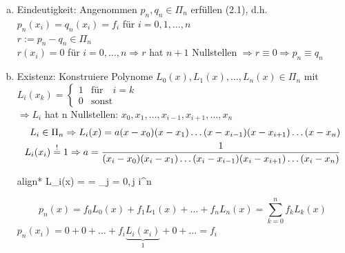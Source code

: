 \begin{enumerate}[(a)]
  \item Eindeutigkeit: Angenommen $p_n, q_n \in \Pi_n$ erfüllen (2.1), d.h. $p_n(x_i)=q_n(x_i)=f_i $ für $i=0,1,\ldots,n$\\
    $r := p_n - q_n \in \Pi_n$ \\
    $r(x_i) = 0$ für $i = 0, \ldots, n \Rightarrow r$ hat $n + 1$ Nullstellen
    $\Rightarrow r \equiv 0 \Rightarrow p_n \equiv q_n$
  \item Existenz: Konstruiere Polynome $L_0(x), L_1(x), \ldots, L_n(x) \in \Pi_n$ mit\\
    $L_i(x_k)=\begin{cases} 1 & \mbox{für } \mbox{ $i = k$} \\ 
      0 & \mbox{sonst} \end{cases}$ \\
    $\Rightarrow L_i$ hat n Nullstellen: $x_0, x_1, \ldots, x_{i-1}, x_{i+1}, \ldots, x_n$
		\begin{align*}    
		L_i \in \Pi_n \Rightarrow L_i(x) = a(x-x_0)(x-x_1)\ldots(x-x_{i-1})(x-x_{i+1})\ldots(x-x_n)\\
    L_i(x_i) \overset{!}{=} 1 \Rightarrow
      a = \frac{1}{(x_i-x_0)(x_i-x_1)\ldots(x_i-x_{i-1})(x_i-x_{i+1})\ldots(x_i-x_n)}\\
    \end{align*}
		\begin{empheq}[innerbox=\fbox,right=\Leftarrow{\text{LAGRANGE-POLYNOME}}]{align*}
		\Rightarrow L_i(x) =  = 
      \prod\limits_{j = 0,\,j \neq i}^n  \\
		\end{empheq}
    \begin{equation*}
      \tag{2.2}
      p_n(x) = f_0 L_0(x) + f_1 L_1(x) + \ldots + f_n L_n(x) = 
      \sum\limits_{k = 0}^n f_k L_k(x)
    \end{equation*}
    $p_n(x_i) = 0 + 0 + \ldots + f_i\underbrace{L_i(x_i)}_{1} + 0 + \ldots = f_i$\\
\end{enumerate}




